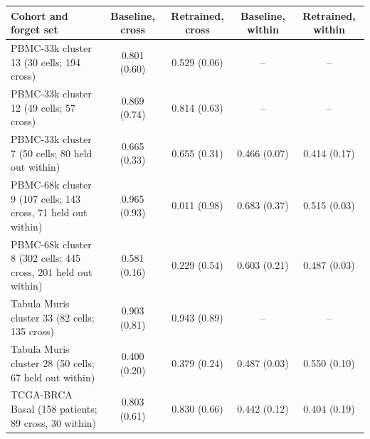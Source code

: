 \begin{tabular}{lcccc}
\toprule
Cohort and forget set & Baseline, cross & Retrained, cross & Baseline, within & Retrained, within \\
\midrule
PBMC-33k cluster 13 (30 cells; 194 cross) & 0.801 (0.60) & 0.529 (0.06) & -- & -- \\
PBMC-33k cluster 12 (49 cells; 57 cross) & 0.869 (0.74) & 0.814 (0.63) & -- & -- \\
PBMC-33k cluster 7 (50 cells; 80 held out within) & 0.665 (0.33) & 0.655 (0.31) & 0.466 (0.07) & 0.414 (0.17) \\
PBMC-68k cluster 9 (107 cells; 143 cross, 71 held out within) & 0.965 (0.93) & 0.011 (0.98) & 0.683 (0.37) & 0.515 (0.03) \\
PBMC-68k cluster 8 (302 cells; 445 cross, 201 held out within) & 0.581 (0.16) & 0.229 (0.54) & 0.603 (0.21) & 0.487 (0.03) \\
Tabula Muris cluster 33 (82 cells; 135 cross) & 0.903 (0.81) & 0.943 (0.89) & -- & -- \\
Tabula Muris cluster 28 (50 cells; 67 held out within) & 0.400 (0.20) & 0.379 (0.24) & 0.487 (0.03) & 0.550 (0.10) \\
TCGA-BRCA Basal (158 patients; 89 cross, 30 within) & 0.803 (0.61) & 0.830 (0.66) & 0.442 (0.12) & 0.404 (0.19) \\
\bottomrule
\end{tabular}
